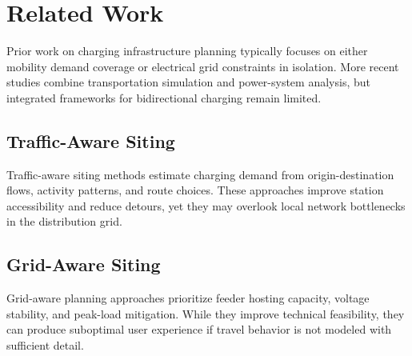 \section{Related Work}
\label{sec:related_work}
Prior work on charging infrastructure planning typically focuses on either mobility demand coverage or electrical grid constraints in isolation. More recent studies combine transportation simulation and power-system analysis, but integrated frameworks for bidirectional charging remain limited.

\subsection{Traffic-Aware Siting}
Traffic-aware siting methods estimate charging demand from origin-destination flows, activity patterns, and route choices. These approaches improve station accessibility and reduce detours, yet they may overlook local network bottlenecks in the distribution grid.

\subsection{Grid-Aware Siting}
Grid-aware planning approaches prioritize feeder hosting capacity, voltage stability, and peak-load mitigation. While they improve technical feasibility, they can produce suboptimal user experience if travel behavior is not modeled with sufficient detail.
